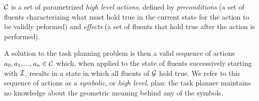 $\mathcal{C}$ is a set of parametrized \emph{high level actions}, defined by \emph{preconditions} (a set
of fluents characterizing what must hold true in the current state for the action
to be validly peformed) and \emph{effects} (a set of fluents that hold true after
the action is performed).

A solution to the task planning problem is then a valid sequence of actions
$a_{0}, a_{1}, ..., a_{n} \in \mathcal{C}$ which, when applied to the state of fluents
successively starting with $\mathcal{I}$, results in a state in which all fluents of
$\mathcal{G}$ hold true. We refer to this sequence of actions as a \emph{symbolic}, or
\emph{high level}, plan: the task planner maintains no knowledge about the geometric meaning
behind any of the symbols.






